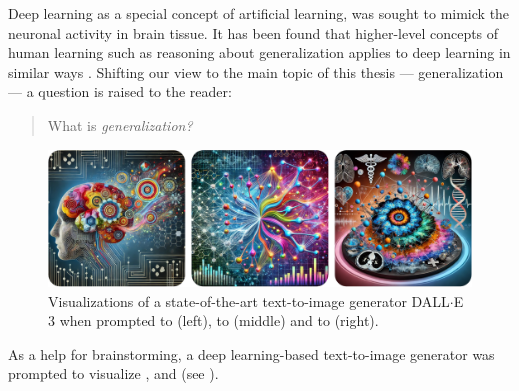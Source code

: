     Deep learning as a special concept of artificial learning, was sought to mimick the neuronal activity in brain tissue. It has been found that higher-level concepts of human learning such as reasoning about generalization applies to deep learning in similar ways \citep{jakel2008generalization}. Shifting our view to the main topic of this thesis --- generalization --- a question is raised to the reader:

    \begin{quote}
        \centering \Large
        What is \emph{generalization?}
    \end{quote}

    \begin{figure}
        \includegraphics[width=\textwidth]{sections/01_introduction/figures/synthesized_generalization.pdf}
        \caption{Visualizations of a state-of-the-art text-to-image generator DALL$\cdot$E 3 \citep{betker2023improving} when prompted to  (left), to  (middle) and to  (right).}
        \label{fig:synthesized_generalization}
    \end{figure}

    As a help for brainstorming, a deep learning-based text-to-image generator \citep{betker2023improving} was prompted to visualize ,  and  (see ).


